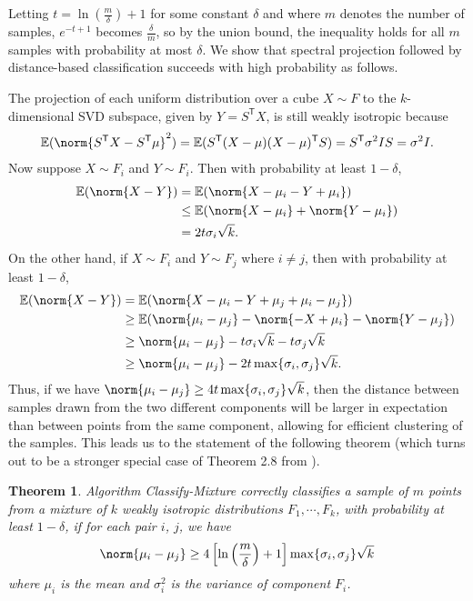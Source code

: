 \documentclass[a4paper,12pt]{article}
\newtheorem{theorem}{Theorem}[subsection]
\theoremstyle{remark}
\newcommand{\transpose}{\mathsf{T}}
\begin{document}
    Letting $t = \ln(\frac{m}{\delta}) + 1$ for some constant $\delta$ and where $m$ denotes the number of samples, $e^{-t + 1}$ becomes $\frac{\delta}{m}$, so by the union bound, the inequality holds for all $m$ samples with probability at most $\delta$. We show that spectral projection followed by distance-based classification succeeds with high probability as follows. \par
    The projection of each uniform distribution over a cube $X \sim F$ to the $k$-dimensional SVD subspace, given by $Y = S^\transpose X$, is still weakly isotropic because
    \begin{align*}
        \mathbb{E}(\norm{S^\transpose X - S^\transpose \mu}^2) = \mathbb{E}(S^\transpose (X - \mu)(X - \mu)^\transpose S) = S^\transpose \sigma^2 IS = \sigma^2 I.
    \end{align*}
    Now suppose $X \sim F_i$ and $Y \sim F_i$. Then with probability at least $1 - \delta$,
    \begin{align*}
        \mathbb{E}(\norm{X - Y}) &= \mathbb{E}(\norm{X - \mu_i - Y + \mu_i}) \\
        &\leq \mathbb{E}(\norm{X - \mu_i} + \norm{Y - \mu_i}) \\
        &= 2t\sigma_i\sqrt{k}.
    \end{align*}
    On the other hand, if $X \sim F_i$ and $Y \sim F_j$ where $i \neq j$, then with probability at least $1 - \delta$,
    \begin{align*}
        \mathbb{E}(\norm{X - Y}) &= \mathbb{E}(\norm{X - \mu_i - Y + \mu_j + \mu_i - \mu_j}) \\
        &\geq \mathbb{E}(\norm{\mu_i - \mu_j} - \norm{-X + \mu_i} - \norm{Y - \mu_j}) \\
        &\geq \norm{\mu_i - \mu_j} - t\sigma_i\sqrt{k} - t\sigma_j\sqrt{k} \\
        &\geq \norm{\mu_i - \mu_j} - 2t\max\{ \sigma_i, \sigma_j \}\sqrt{k}.
    \end{align*}
    Thus, if we have $\norm{\mu_i - \mu_j} \geq 4t\max\{ \sigma_i, \sigma_j \}\sqrt{k}$, then the distance between samples drawn from the two different components will be larger in expectation than between points from the same component, allowing for efficient clustering of the samples. This leads us to the statement of the following theorem (which turns out to be a stronger special case of Theorem 2.8 from \cite{spectral}).
    \begin{theorem}
        Algorithm \emph{Classify-Mixture} correctly classifies a sample of $m$ points from a mixture of $k$ weakly isotropic distributions $F_1, \cdots, F_k$, with probability at least $1 - \delta$, if for each pair $i$, $j$, we have
        \begin{align*}
            \norm{\mu_i - \mu_j} \geq 4 \left[ \ln \left( \frac{m}{\delta} \right) + 1 \right] \max\{ \sigma_i, \sigma_j \}\sqrt{k}
        \end{align*}
        where $\mu_i$ is the mean and $\sigma_i^2$ is the variance of component $F_i$.
    \end{theorem}
\end{document}
